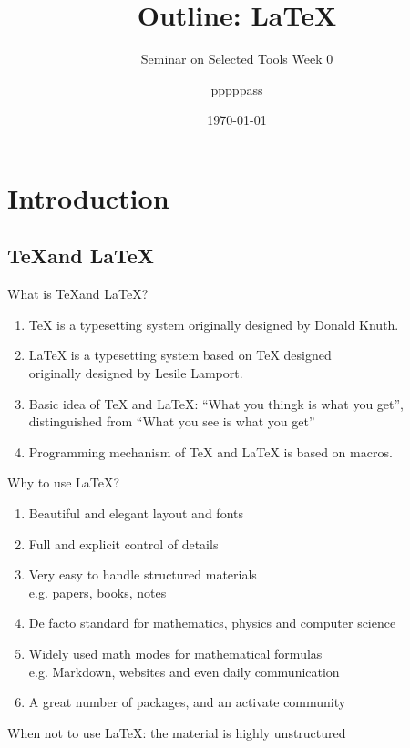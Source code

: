 \documentclass[english, nochinese]{pkuslide}
\title{Outline: \LaTeX}
\subtitle{Seminar on Selected Tools Week 0}
\author{pppppass}
\date{\today}
\begin{document}
\begin{frame}
\titlepage
\end{frame}

\begin{frame}
\tableofcontents[subsectionstyle=show]
\end{frame}

\section{Introduction}

\begin{frame}
\sectionpage
\end{frame}

\subsection{\TeX and \LaTeX}

\begin{frame}{What is \TeX and \LaTeX?}
\begin{enumerate}
\item \TeX{} is a typesetting system originally designed by Donald Knuth.
\item \LaTeX{} is a typesetting system based on \TeX{} designed \\
originally designed by Lesile Lamport.
\item Basic idea of \TeX{} and \LaTeX{}: ``What you thingk is what you get'', \\ distinguished from ``What you see is what you get''
\item Programming mechanism of \TeX{} and \LaTeX{} is based on macros.
\end{enumerate}
\end{frame}

\begin{frame}{Why to use \LaTeX?}
\begin{enumerate}
\item Beautiful and elegant layout and fonts
\item Full and explicit control of details
\item Very easy to handle structured materials \\
e.g. papers, books, notes
\item De facto standard for mathematics, physics and computer science
\item Widely used math modes for mathematical formulas \\
e.g. Markdown, websites and even daily communication
\item A great number of packages, and an activate community
\end{enumerate}

When not to use \LaTeX{}: the material is highly unstructured
\end{frame}
\end{document}
